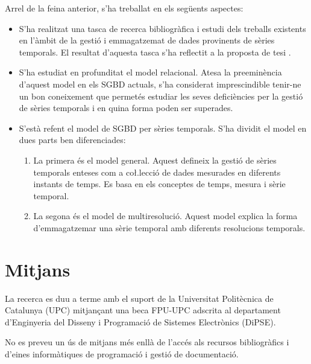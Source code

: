 Arrel de la feina anterior, s'ha treballat en els següents aspectes:
\begin{itemize}
\item S'ha realitzat una tasca de recerca bibliogràfica i estudi dels
  treballs existents en l'àmbit de la gestió i emmagatzemat de dades
  provinents de sèries temporals. El resultat d'aquesta tasca s'ha
  reflectit a la proposta de tesi \parencite{llusa12:ptd}.
\item S'ha estudiat en profunditat el model relacional. Atesa la
  preeminència d'aquest model en els SGBD actuals, s'ha considerat
  imprescindible tenir-ne un bon coneixement que permetés estudiar les
  seves deficiències per la gestió de sèries temporals i en quina
  forma poden ser superades.
\item S'està refent el model de SGBD per sèries temporals.  S'ha
  dividit el model en dues parts ben diferenciades:
  \begin{enumerate}
  \item La primera és el model general. Aquest defineix la gestió de
    sèries temporals enteses com a co\l.lecció de dades mesurades en
    diferents instants de temps. Es basa en els conceptes de temps,
    mesura i sèrie temporal.
  \item La segona és el model de multiresolució. Aquest model explica
    la forma d'emmagatzemar una sèrie temporal amb diferents
    resolucions temporals.
  \end{enumerate}
\end{itemize}





\section{Mitjans}

La recerca es duu a terme amb el suport de la Universitat Politècnica
de Catalunya (UPC) mitjançant una beca FPU-UPC adscrita al departament
d'Enginyeria del Disseny i Programació de Sistemes Electrònics
(DiPSE).

No es preveu un ús de mitjans més enllà de l'accés als
recursos bibliogràfics i d'eines informàtiques de programació i
gestió de documentació.



